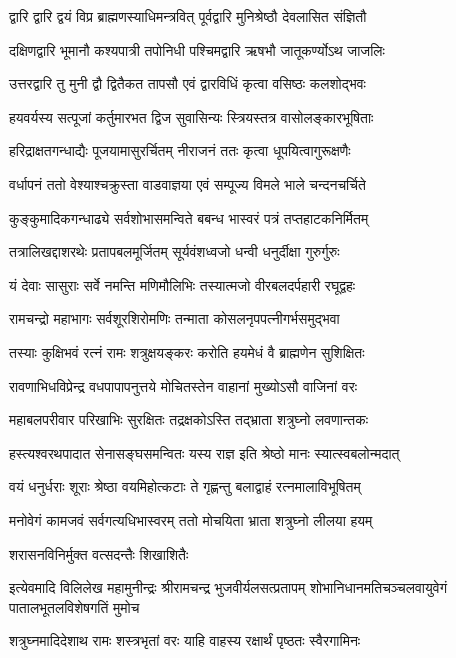 \twolineshloka
{द्वारि द्वारि द्वयं विप्र ब्राह्मणस्याधिमन्त्रवित्}
{पूर्वद्वारि मुनिश्रेष्ठौ देवलासित संज्ञितौ}%

\twolineshloka
{दक्षिणद्वारि भूमानौ कश्यपात्री तपोनिधी}
{पश्चिमद्वारि ऋषभौ जातूकर्ण्योऽथ जाजलिः}%

\twolineshloka
{उत्तरद्वारि तु मुनी द्वौ द्वितैकत तापसौ}
{एवं द्वारविधिं कृत्वा वसिष्ठः कलशोद्भवः}%

\twolineshloka
{हयवर्यस्य सत्पूजां कर्तुमारभत द्विज}
{सुवासिन्यः स्त्रियस्तत्र वासोलङ्कारभूषिताः}%

\twolineshloka
{हरिद्राक्षतगन्धाद्यैः पूजयामासुरर्चितम्}
{नीराजनं ततः कृत्वा धूपयित्वागुरूक्षणैः}%

\twolineshloka
{वर्धापनं ततो वेश्याश्चक्रुस्ता वाडवाज्ञया}
{एवं सम्पूज्य विमले भाले चन्दनचर्चिते}%

\twolineshloka
{कुङ्कुमादिकगन्धाढ्ये सर्वशोभासमन्विते}
{बबन्ध भास्वरं पत्रं तप्तहाटकनिर्मितम्}%

\twolineshloka
{तत्रालिखद्दाशरथेः प्रतापबलमूर्जितम्}
{सूर्यवंशध्वजो धन्वी धनुर्दीक्षा गुरुर्गुरुः}%

\twolineshloka
{यं देवाः सासुराः सर्वे नमन्ति मणिमौलिभिः}
{तस्यात्मजो वीरबलदर्पहारी रघूद्वहः}%

\twolineshloka
{रामचन्द्रो महाभागः सर्वशूरशिरोमणिः}
{तन्माता कोसलनृपपत्नीगर्भसमुद्भवा}%

\twolineshloka
{तस्याः कुक्षिभवं रत्नं रामः शत्रुक्षयङ्करः}
{करोति हयमेधं वै ब्राह्मणेन सुशिक्षितः}%

\twolineshloka
{रावणाभिधविप्रेन्द्र वधपापापनुत्तये}
{मोचितस्तेन वाहानां मुख्योऽसौ वाजिनां वरः}%

\twolineshloka
{महाबलपरीवार परिखाभिः सुरक्षितः}
{तद्रक्षकोऽस्ति तद्भ्राता शत्रुघ्नो लवणान्तकः}%

\twolineshloka
{हस्त्यश्वरथपादात सेनासङ्घसमन्वितः}
{यस्य राज्ञ इति श्रेष्ठो मानः स्यात्स्वबलोन्मदात्}%

\twolineshloka
{वयं धनुर्धराः शूराः श्रेष्ठा वयमिहोत्कटाः}
{ते गृह्णन्तु बलाद्वाहं रत्नमालाविभूषितम्}%

\twolineshloka
{मनोवेगं कामजवं सर्वगत्यधिभास्वरम्}
{ततो मोचयिता भ्राता शत्रुघ्नो लीलया हयम्}%

\onelineshloka
{शरासनविनिर्मुक्त वत्सदन्तैः शिखाशितैः}%

\fourlineindentedshloka
{इत्येवमादि विलिलेख महामुनीन्द्रः}
{श्रीरामचन्द्र भुजवीर्यलसत्प्रतापम्}
{शोभानिधानमतिचञ्चलवायुवेगं}
{पातालभूतलविशेषगतिं मुमोच}%

\twolineshloka
{शत्रुघ्नमादिदेशाथ रामः शस्त्रभृतां वरः}
{याहि वाहस्य रक्षार्थं पृष्ठतः स्वैरगामिनः}%

